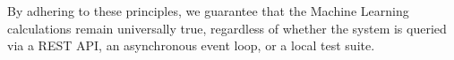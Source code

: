 By adhering to these principles, we guarantee that the Machine Learning calculations remain universally true, regardless of whether the system is queried via a REST API, an asynchronous event loop, or a local test suite.






